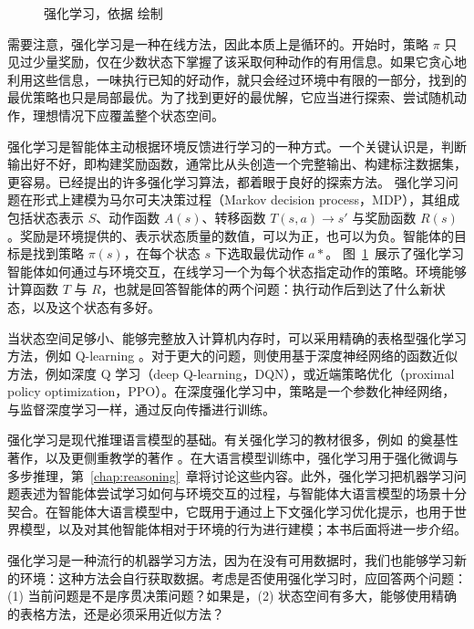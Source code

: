 \begin{figure}[tb]
  \begin{center}
    
    \caption{强化学习，依据 \citet{sutton2018reinforcement} 绘制}\label{fig:rl-org}
  \end{center}
\end{figure}

需要注意，强化学习是一种在线方法，因此本质上是循环的。开始时，策略 $\pi$ 只见过少量奖励，仅在少数状态下掌握了该采取何种动作的有用信息。如果它贪心地利用这些信息，一味执行已知的好动作，就只会经过环境中有限的一部分，找到的最优策略也只是局部最优。为了找到更好的最优解，它应当进行探索、尝试随机动作，理想情况下应覆盖整个状态空间。

强化学习是智能体主动根据环境反馈进行学习的一种方式。一个关键认识是，判断输出好不好，即构建奖励函数，通常比从头创造一个完整输出、构建标注数据集，更容易。已经提出的许多强化学习算法，都着眼于良好的探索方法。
强化学习问题在形式上建模为马尔可夫决策过程（Markov decision process，MDP），其组成包括状态表示 $S$、动作函数 $A(s)$、转移函数 $T(s, a) \rightarrow s'$ 与奖励函数 $R(s)$。奖励是环境提供的、表示状态质量的数值，可以为正，也可以为负。智能体的目标是找到策略 $\pi(s)$，在每个状态 $s$ 下选取最优动作 $a*$。
图~\ref{fig:rl-org}~展示了强化学习智能体如何通过与环境交互，在线学习一个为每个状态指定动作的策略。环境能够计算函数 $T$ 与 $R$，也就是回答智能体的两个问题：执行动作后到达了什么新状态，以及这个状态有多好。

当状态空间足够小、能够完整放入计算机内存时，可以采用精确的表格型强化学习方法，例如 Q-learning \citep{watkins1992q}。对于更大的问题，则使用基于深度神经网络的函数近似方法，例如深度 Q 学习（deep Q-learning，DQN）\citep{mnih2015human}，或近端策略优化（proximal policy optimization，PPO）\citep{schulman2017proximal}。在深度强化学习中，策略是一个参数化神经网络，与监督深度学习一样，通过反向传播进行训练。

强化学习是现代推理语言模型的基础。有关强化学习的教材很多，例如 \citet{sutton2018reinforcement} 的奠基性著作，以及更侧重教学的著作 \citep{graesser2019foundations,plaat2020learning,plaat2022deep}。在大语言模型训练中，强化学习用于强化微调与多步推理，第~\ref{chap:reasoning}~章将讨论这些内容。此外，强化学习把机器学习问题表述为智能体尝试学习如何与环境交互的过程，与智能体大语言模型的场景十分契合。在智能体大语言模型中，它既用于通过上下文强化学习优化提示，也用于世界模型，以及对其他智能体相对于环境的行为进行建模；本书后面将进一步介绍。

强化学习是一种流行的机器学习方法，因为在没有可用数据时，我们也能够学习新的环境：这种方法会自行获取数据。考虑是否使用强化学习时，应回答两个问题：(1) 当前问题是不是序贯决策问题？如果是，(2) 状态空间有多大，能够使用精确的表格方法，还是必须采用近似方法？

